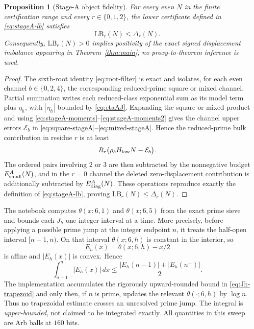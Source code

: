 \documentclass[11pt]{article}
\newtheorem{proposition}[theorem]{Proposition}
\theoremstyle{definition}
\newcommand{\abs}[1]{\left|#1\right|}
\begin{document}
\begin{proposition}[Stage-A object fidelity]\label{prop:stageA-fidelity}
For every even $N$ in the finite certification range and every $r\in\{0,1,2\}$, the lower certificate defined in \eqref{eq:stageA-lb} satisfies
\[
\boxed{\mathrm{LB}_r(N)\le\Delta_r(N).}
\]
Consequently, $\mathrm{LB}_r(N)>0$ implies positivity of the exact signed displacement imbalance appearing in Theorem~\ref{thm:main}; no proxy-to-theorem inference is used.
\end{proposition}
\begin{proof}
The sixth-root identity \eqref{eq:root-filter} is exact and isolates, for each even channel $b\in\{0,2,4\}$, the corresponding reduced-prime square or mixed channel. Partial summation writes each reduced-class exponential sum as its model term plus $\eta_h$, with $|\eta_h|$ bounded by \eqref{eq:etaAJ}. Expanding the square or mixed product and using \eqref{eq:stageA-moments}--\eqref{eq:stageA-moments2} gives the channel upper errors $\mathcal E_b$ in \eqref{eq:square-stageA}--\eqref{eq:mixed-stageA}. Hence the reduced-prime bulk contribution in residue $r$ is at least
\[
R_r\bigl(\rho_bH_{\rm low}N-\mathcal E_b\bigr).
\]
The ordered pairs involving $2$ or $3$ are then subtracted by the nonnegative budget $E_{\rm small}^{A}(N)$, and in the $r=0$ channel the deleted zero-displacement contribution is additionally subtracted by $E_{\rm diag}^{A}(N)$. These operations reproduce exactly the definition of \eqref{eq:stageA-lb}, proving $\mathrm{LB}_r(N)\le\Delta_r(N)$.
\end{proof}

The notebook computes $\theta(x;6,1)$ and $\theta(x;6,5)$ from the exact prime sieve and bounds each $J_h$ one integer interval at a time. More precisely, before applying a possible prime jump at the integer endpoint $n$, it treats the half-open interval $[n-1,n)$. On that interval $\theta(x;6,h)$ is constant in the interior, so
\[
E_h(x)=\theta(x;6,h)-x/2
\]
is affine and $\abs{E_h(x)}$ is convex. Hence
\begin{equation}\label{eq:Jh-trapezoid}
\int_{n-1}^{n}\abs{E_h(x)}\,dx
\le
\frac{\abs{E_h(n-1)}+\abs{E_h(n^-)}}{2}.
\end{equation}
The implementation accumulates the rigorously upward-rounded bound in \eqref{eq:Jh-trapezoid} and only then, if $n$ is prime, updates the relevant $\theta(\cdot;6,h)$ by $\log n$. Thus no trapezoidal estimate crosses an unresolved prime jump. The integral is \emph{upper-bounded}, not claimed to be integrated exactly. All quantities in this sweep are Arb balls at $160$ bits.
\end{document}
